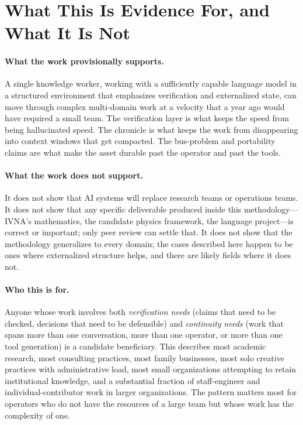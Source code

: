 \documentclass[12pt]{article}
\begin{document}
\section{What This Is Evidence For, and What It Is Not}
\label{sec:evidence}

\paragraph{What the work provisionally supports.} A single knowledge worker, working with a sufficiently capable language model in a structured environment that emphasizes verification and externalized state, can move through complex multi-domain work at a velocity that a year ago would have required a small team. The verification layer is what keeps the speed from being hallucinated speed. The chronicle is what keeps the work from disappearing into context windows that get compacted. The bus-problem and portability claims are what make the asset durable past the operator and past the tools.

\paragraph{What the work does not support.} It does not show that AI systems will replace research teams or operations teams. It does not show that any specific deliverable produced inside this methodology---IVNA's mathematics, the candidate physics framework, the language project---is correct or important; only peer review can settle that. It does not show that the methodology generalizes to every domain; the cases described here happen to be ones where externalized structure helps, and there are likely fields where it does not.

\paragraph{Who this is for.} Anyone whose work involves both \emph{verification needs} (claims that need to be checked, decisions that need to be defensible) and \emph{continuity needs} (work that spans more than one conversation, more than one operator, or more than one tool generation) is a candidate beneficiary. This describes most academic research, most consulting practices, most family businesses, most solo creative practices with administrative load, most small organizations attempting to retain institutional knowledge, and a substantial fraction of staff-engineer and individual-contributor work in larger organizations. The pattern matters most for operators who do not have the resources of a large team but whose work has the complexity of one.
\end{document}
